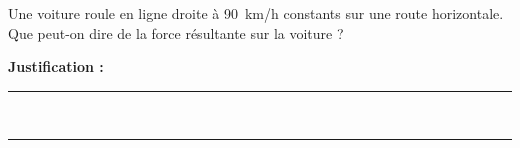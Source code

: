 Une voiture roule en ligne droite à \qty{90}{km/h} constants sur une route horizontale. Que peut-on dire de la force résultante sur la voiture ?

\choices

\noindent\textbf{Justification :} \hrulefill \\[2.5ex]
\rule{\linewidth}{0.4pt} \\[2.5ex]
\rule{\linewidth}{0.4pt}
\vfill
